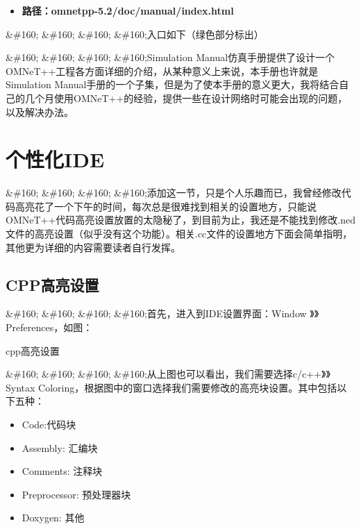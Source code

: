 \begin{itemize}
\item \textbf{路径：omnetpp-5.2\slash doc\slash manual\slash index.html}

\end{itemize}

\&\#160; \&\#160; \&\#160; \&\#160;入口如下（绿色部分标出）



\&\#160; \&\#160; \&\#160; \&\#160;Simulation Manual仿真手册提供了设计一个OMNeT++工程各方面详细的介绍，从某种意义上来说，本手册也许就是Simulation Manual手册的一个子集，但是为了使本手册的意义更大，我将结合自己的几个月使用OMNeT++的经验，提供一些在设计网络时可能会出现的问题，以及解决办法。

\section{个性化IDE}
\label{个性化ide}

\&\#160; \&\#160; \&\#160; \&\#160;添加这一节，只是个人乐趣而已，我曾经修改代码高亮花了一个下午的时间，每次总是很难找到相关的设置地方，只能说OMNeT++代码高亮设置放置的太隐秘了，到目前为止，我还是不能找到修改.ned文件的高亮设置（似乎没有这个功能）。相关.cc文件的设置地方下面会简单指明，其他更为详细的内容需要读者自行发挥。

\subsection{CPP高亮设置}
\label{cpp高亮设置}

\&\#160; \&\#160; \&\#160; \&\#160;首先，进入到IDE设置界面：Window 》》 Preferences，如图：

cpp高亮设置



\&\#160; \&\#160; \&\#160; \&\#160;从上图也可以看出，我们需要选择c\slash c++》》Syntax Coloring，根据图中的窗口选择我们需要修改的高亮块设置。其中包括以下五种：

\begin{itemize}
\item Code:代码块

\item Assembly: 汇编块

\item Comments: 注释块

\item Preprocessor: 预处理器块

\item Doxygen: 其他

\end{itemize}

